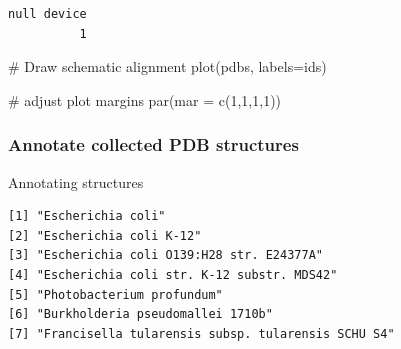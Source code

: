 \documentclass[
  letterpaper,
  DIV=11,
  numbers=noendperiod]{scrartcl}
\newenvironment{Shaded}{\begin{snugshade}}{\end{snugshade}}
\newcommand{\AttributeTok}[1]{\textcolor[rgb]{0.40,0.45,0.13}{#1}}
\newcommand{\CommentTok}[1]{\textcolor[rgb]{0.37,0.37,0.37}{#1}}
\newcommand{\DecValTok}[1]{\textcolor[rgb]{0.68,0.00,0.00}{#1}}
\newcommand{\FunctionTok}[1]{\textcolor[rgb]{0.28,0.35,0.67}{#1}}
\newcommand{\NormalTok}[1]{\textcolor[rgb]{0.00,0.23,0.31}{#1}}
\newcommand{\OtherTok}[1]{\textcolor[rgb]{0.00,0.23,0.31}{#1}}
\newcommand{\SpecialCharTok}[1]{\textcolor[rgb]{0.37,0.37,0.37}{#1}}
\begin{document}
\begin{Shaded}
\end{Shaded}

\begin{verbatim}
null device 
          1 
\end{verbatim}

\begin{Shaded}
\begin{Highlighting}[]
\CommentTok{\# Draw schematic alignment}
\FunctionTok{plot}\NormalTok{(pdbs, }\AttributeTok{labels=}\NormalTok{ids)}

\CommentTok{\# adjust plot margins}
\FunctionTok{par}\NormalTok{(}\AttributeTok{mar =} \FunctionTok{c}\NormalTok{(}\DecValTok{1}\NormalTok{,}\DecValTok{1}\NormalTok{,}\DecValTok{1}\NormalTok{,}\DecValTok{1}\NormalTok{))}
\end{Highlighting}
\end{Shaded}

\hypertarget{annotate-collected-pdb-structures}{%
\subsubsection{Annotate collected PDB
structures}\label{annotate-collected-pdb-structures}}

Annotating structures

\begin{Shaded}
\end{Shaded}

\begin{verbatim}
[1] "Escherichia coli"                                
[2] "Escherichia coli K-12"                           
[3] "Escherichia coli O139:H28 str. E24377A"          
[4] "Escherichia coli str. K-12 substr. MDS42"        
[5] "Photobacterium profundum"                        
[6] "Burkholderia pseudomallei 1710b"                 
[7] "Francisella tularensis subsp. tularensis SCHU S4"
\end{verbatim}
\end{document}
